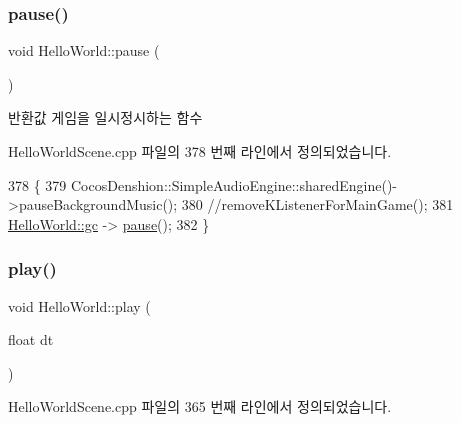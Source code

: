 \subsubsection{\texorpdfstring{pause()}{pause()}}
{\footnotesize\ttfamily void Hello\+World\+::pause (\begin{DoxyParamCaption}{ }\end{DoxyParamCaption})\hspace{0.3cm}{\ttfamily [protected]}}

\begin{DoxyReturn}{반환값}
게임을 일시정시하는 함수 
\end{DoxyReturn}


Hello\+World\+Scene.\+cpp 파일의 378 번째 라인에서 정의되었습니다.


\begin{DoxyCode}
378                       \{
379     CocosDenshion::SimpleAudioEngine::sharedEngine()->pauseBackgroundMusic();
380     \textcolor{comment}{//removeKListenerForMainGame();}
381     \hyperlink{class_hello_world_a547cb213126911d9a7151f8259dc7102}{HelloWorld::gc} -> \hyperlink{class_hello_world_af72bece97d2fe997936df92723636298}{pause}();
382 \}
\end{DoxyCode}
\mbox{\label{class_hello_world_ac1aee383de0a7c30e84f7efc0da8d944}} 
\subsubsection{\texorpdfstring{play()}{play()}}
{\footnotesize\ttfamily void Hello\+World\+::play (\begin{DoxyParamCaption}\item[{float}]{dt }\end{DoxyParamCaption})\hspace{0.3cm}{\ttfamily [protected]}}



Hello\+World\+Scene.\+cpp 파일의 365 번째 라인에서 정의되었습니다.


